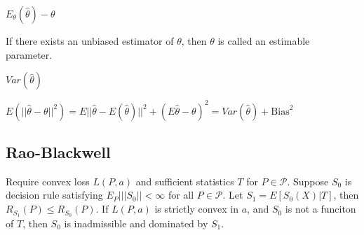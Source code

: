 \pline
[Bias] $E_\theta(\hat\theta)-\theta$

If there exists an unbiased estimator of $\theta$, then $\theta$ is called an estimable parameter.

\pline
[Variance] $Var(\hat\theta)$

\pline
[MSE] $E(||\hat\theta-\theta||^2)=E||\hat\theta-E(\hat\theta)||^2+(E\hat\theta-\theta)^2=Var(\hat\theta)+\text{Bias}^2$

\subsection{Rao-Blackwell}

Require convex loss $L(P, a)$ and sufficient statistics $T$ for $P\in\mathcal{P}$.
Suppose $S_0$ is decision rule satisfying $E_P|||S_0|| < \infty$ for all $P\in\mathcal{P}$. Let $S_1 = E[S_0(X)|T]$, then $R_{S_1}(P)\leq R_{S_0}(P)$.
If $L(P, a)$ is strictly convex in $a$, and $S_0$ is not a funciton of $T$, then $S_0$ is inadmissible and dominated by $S_1$.